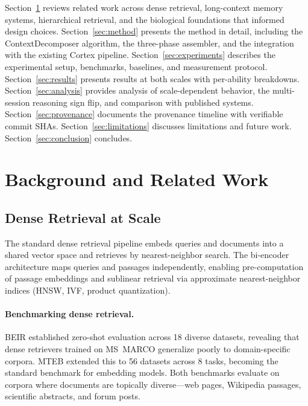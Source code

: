\documentclass[11pt]{article}
\begin{document}
Section~\ref{sec:background} reviews related work across dense
retrieval, long-context memory systems, hierarchical retrieval, and
the biological foundations that informed design choices.
Section~\ref{sec:method} presents the method in detail, including
the ContextDecomposer algorithm, the three-phase assembler, and the
integration with the existing Cortex pipeline.
Section~\ref{sec:experiments} describes the experimental setup,
benchmarks, baselines, and measurement protocol.
Section~\ref{sec:results} presents results at both scales with
per-ability breakdowns.  Section~\ref{sec:analysis} provides
analysis of scale-dependent behavior, the multi-session reasoning
sign flip, and comparison with published systems.
Section~\ref{sec:provenance} documents the provenance timeline with
verifiable commit SHAs.  Section~\ref{sec:limitations} discusses
limitations and future work.  Section~\ref{sec:conclusion} concludes.

\section{Background and Related Work}
\label{sec:background}

\subsection{Dense Retrieval at Scale}
\label{sec:dense-retrieval}

The standard dense retrieval pipeline embeds queries and documents
into a shared vector space and retrieves by nearest-neighbor search.
The bi-encoder architecture \citep{Karpukhin2020,Reimers2019} maps
queries and passages independently, enabling pre-computation of
passage embeddings and sublinear retrieval via approximate
nearest-neighbor indices (HNSW, IVF, product quantization).

\paragraph{Benchmarking dense retrieval.}
BEIR \citep{Thakur2021} established zero-shot evaluation across 18
diverse datasets, revealing that dense retrievers trained on MS~MARCO
generalize poorly to domain-specific corpora.  MTEB
\citep{Muennighoff2023} extended this to 56 datasets across 8 tasks,
becoming the standard benchmark for embedding models.  Both benchmarks
evaluate on corpora where documents are topically diverse---web pages,
Wikipedia passages, scientific abstracts, and forum posts.
\end{document}
